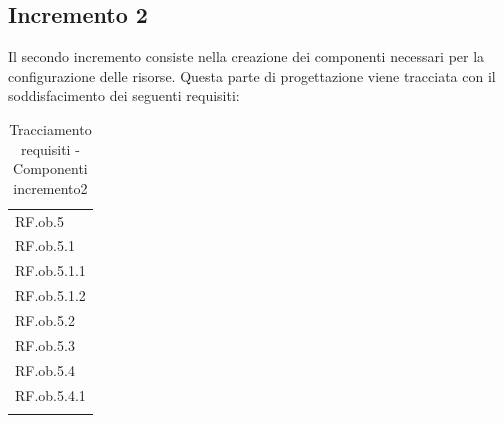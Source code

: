 \subsection{Incremento 2}
Il secondo incremento consiste nella creazione dei componenti necessari per la configurazione delle risorse. Questa parte di progettazione viene tracciata con il soddisfacimento dei seguenti requisiti:

\begin{longtable}{|>{\centering}p{3cm}|}
    \hline
    \multicolumn{1}{|c|}{\textbf{Requisiti}} \\ %
      \hline
        RF.ob.5 \tabularnewline \hline
		RF.ob.5.1 \tabularnewline \hline
		RF.ob.5.1.1 \tabularnewline \hline
		RF.ob.5.1.2 \tabularnewline \hline
		RF.ob.5.2 \tabularnewline \hline
		RF.ob.5.3 \tabularnewline \hline
		RF.ob.5.4 \tabularnewline \hline
		RF.ob.5.4.1 \tabularnewline \hline
    \caption{Tracciamento requisiti - Componenti incremento2}
    \label{tab:Tracciamento requisiti - Componenti incremento2}
\end{longtable}


